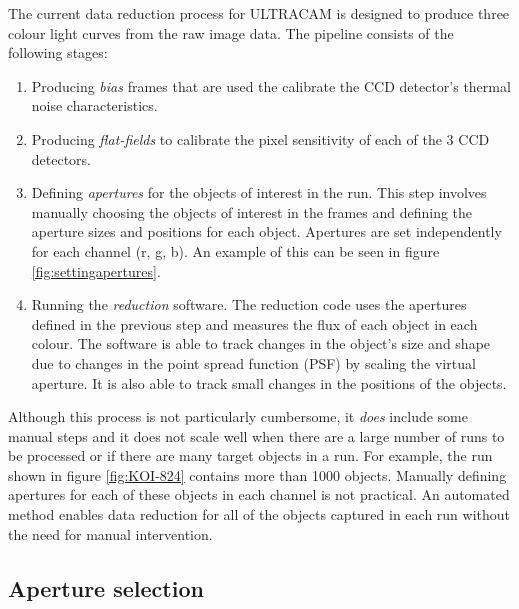 The current data reduction process for ULTRACAM is designed to produce three colour light curves from the raw image data. The pipeline consists of the following stages:
\begin{enumerate}
	\item Producing \emph{bias} frames that are used the calibrate the CCD detector's thermal noise characteristics. 
	\item Producing \emph{flat-fields} to calibrate the pixel sensitivity of each of the 3 CCD detectors. 
	\item Defining \emph{apertures} for the objects of interest in the run. This step involves manually choosing the objects of interest in the frames and defining the aperture sizes and positions for each object. Apertures are set independently for each channel (r, g, b). An example of this can be seen in figure \ref{fig:settingapertures}.
	\item Running the \emph{reduction} software. The reduction code uses the apertures defined in the previous step and measures the flux of each object in each colour. The software is able to track changes in the object's size and shape due to changes in the point spread function (PSF) by scaling the virtual aperture. It is also able to track small changes in the positions of the objects. 
\end{enumerate} 
Although this process is not particularly cumbersome, it \emph{does} include some manual steps and it does not scale well when there are a large number of runs to be processed or if there are many target objects in a run. For example, the run shown in figure \ref{fig:KOI-824} contains more than 1000 objects. Manually defining apertures for each of these objects in each channel is not practical. An automated method enables data reduction for all of the objects captured in each run without the need for manual intervention. 

\subsection{Aperture selection}


